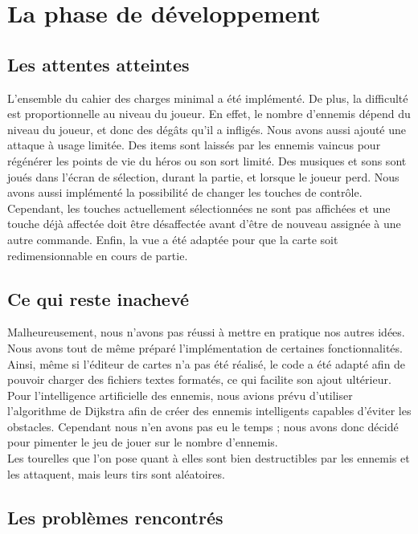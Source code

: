 \section{La phase de développement}

\subsection{Les attentes atteintes}

L'ensemble du cahier des charges minimal a été implémenté. De plus, la difficulté est proportionnelle au niveau du joueur. En effet, le nombre d'ennemis dépend du niveau du joueur, et donc des dégâts qu'il a infligés. Nous avons aussi ajouté une attaque à usage limitée. Des items sont laissés par les ennemis vaincus pour régénérer les points de vie du héros ou son sort limité. Des musiques et sons sont joués dans l'écran de sélection, durant la partie, et lorsque le joueur perd. Nous avons aussi implémenté la possibilité de changer les touches de contrôle. Cependant, les touches actuellement sélectionnées ne sont pas affichées et une touche déjà affectée doit être désaffectée avant d'être de nouveau assignée à une autre commande. Enfin, la vue a été adaptée pour que la carte soit redimensionnable en cours de partie. 

\subsection{Ce qui reste inachevé}

Malheureusement, nous n'avons pas réussi à mettre en pratique nos autres idées. Nous avons tout de même préparé l'implémentation de certaines fonctionnalités. Ainsi, même si l'éditeur de cartes n'a pas été réalisé, le code a été adapté afin de pouvoir charger des fichiers textes formatés, ce qui facilite son ajout ultérieur. \\
Pour l'intelligence artificielle des ennemis, nous avions prévu d'utiliser l'algorithme de Dijkstra afin de créer des ennemis intelligents capables d'éviter les obstacles. Cependant nous n'en avons pas eu le temps ; nous avons donc décidé pour pimenter le jeu de jouer sur le nombre d'ennemis. \\
Les tourelles que l'on pose quant à elles sont bien destructibles par les ennemis et les attaquent, mais leurs tirs sont aléatoires.

\subsection{Les problèmes rencontrés}

